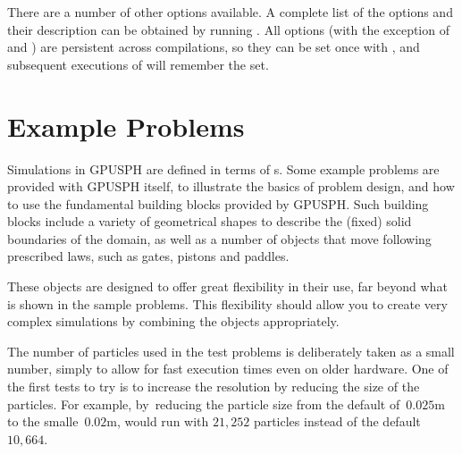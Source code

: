 \documentclass[12pt]{memoir}
\begin{document}
There are a number of other options available. A complete list of the
options and their description can be obtained by running . All options (with the exception of  and
) are persistent across compilations, so they can be set once
with , and subsequent executions of 
will remember the  set.


\section{Example Problems}

Simulations in GPUSPH are defined in terms of s. Some
example problems are provided with GPUSPH itself, to illustrate the
basics of problem design, and how to use the fundamental building blocks
provided by GPUSPH. Such building blocks include a variety of
geometrical shapes to describe the (fixed) solid boundaries of the
domain, as well as a number of objects that move following prescribed
laws, such as gates, pistons and paddles.

These objects are designed to offer great flexibility in their use, far
beyond what is shown in the sample problems. This flexibility should
allow you to create very complex simulations by combining the objects
appropriately.

\iffalse
GPUSPH has options for specified moving objects, which are used to make
piston and paddle wavemakers and a moving gate. These objects are
comprised of particles that are distinguished by identifying their type
as GATEPART, PISTONPART, and PADDLEPART. (Water is distinguished by
FLUIDPART and fixed boundary particles are of type BOUNDPART.) The
distinction between GATEPART and PISTONPART is that the particles of the
GATE are moved by providing an arbitrary (possibly time-varying)
velocity vector in the problem's callback function and a PISTONPART
particle is moved by providing a displacement for the vertical piston in
(only the) x direction with time, again via the callback function.
\else
{}
\fi

The number of particles used in the test problems is deliberately taken
as a small number, simply to allow for fast execution times even on
older hardware. One of the first tests to try is to increase the
resolution by reducing the size of the particles. For example,
by~reducing the particle size from the default of~$0.025$m to the
smalle~$0.02$m,  would run with $21,252$ particles
instead of the default $10,664$.
\end{document}
